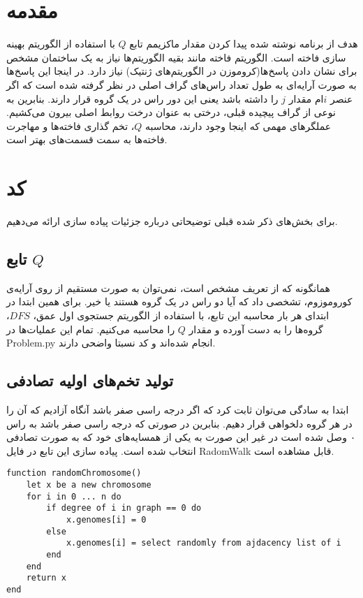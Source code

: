 \documentclass{article}
\begin{document}
\section*{مقدمه}
هدف از برنامه‌ نوشته شده پیدا کردن مقدار ماکزیمم تابع $Q$ با استفاده از الگوریتم بهینه سازی فاخته است. الگوریتم فاخته مانند بقیه الگوریتم‌ها نیاز به یک ساختمان مشخص برای نشان دادن پاسخ‌ها(کروموزن در الگوریتم‌های ژنتیک) نیاز دارد. در اینجا این پاسخ‌ها به صورت آرایه‌ای به طول تعداد راس‌های گراف اصلی در نظر گرفته شده است که اگر عنصر $i$ام مقدار $j$ را داشته باشد یعنی این دور راس در یک گروه‌ قرار دارند. بنابرین به نوعی از گراف پیچیده‌ قبلی، درختی به عنوان درخت روابط اصلی بیرون می‌کشیم. عملگرهای مهمی که اینجا وجود‌ دارند، محاسبه $Q$، تخم گذاری فاخته‌ها و مهاجرت فاخته‌ها به سمت قسمت‌های بهتر است.

\section*{کد}
برای بخش‌های ذکر شده قبلی توضیحاتی درباره جزئیات پیاده سازی ارائه می‌دهیم.
\subsection*{تابع $Q$}
همانگونه که از تعریف مشخص است، نمی‌توان به صورت مستقیم از روی آرایه‌ی کوروموزوم، تشخصی داد که آیا دو راس در یک گروه‌ هستند یا خیر. برای همین ابتدا در ابتدای هر بار محاسبه این تابع، با استفاده از الگوریتم جستجوی اول عمق، $DFS$، گروه‌ها را به دست آورده و مقدار $Q$ را محاسبه می‌کنیم. تمام این عملیات‌ها در Problem.py انجام شده‌اند و کد نسبتا واضحی دارند. 

\subsection*{تولید تخم‌های اولیه تصادفی}
ابتدا به سادگی می‌توان ثابت کرد که اگر درجه‌ راسی صفر باشد آنگاه آزادیم که آن را در هر گروه دلخواهی قرار دهیم. بنابرین در صورتی که درجه راسی صفر باشد به راس ۰ وصل شده است در غیر این صورت به یکی از همسایه‌های خود که به صورت تصادفی انتخاب شده است. پیاده سازی این تابع در فایل RadomWalk قابل مشاهده است.
\begin{latin}
\begin{lstlisting}[style=lua]
function randomChromosome()
	let x be a new chromosome
	for i in 0 ... n do
		if degree of i in graph == 0 do
			x.genomes[i] = 0
		else
			x.genomes[i] = select randomly from ajdacency list of i
		end
	end
	return x
end
\end{lstlisting}
\end{latin}
\end{document}
